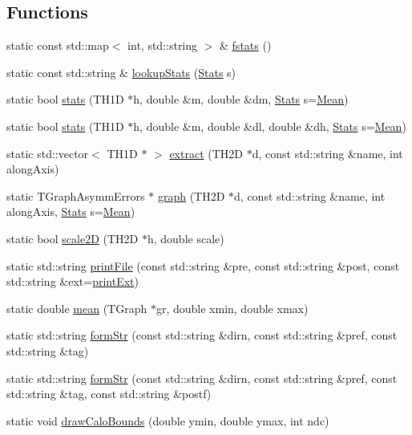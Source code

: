 \subsection*{Functions}
\begin{DoxyCompactItemize}
\item 
static const std\+::map$<$ int, std\+::string $>$ \& \hyperlink{namespaceHistUtils_a763ef83bda6c72effba6b89023f6ed51}{fstats} ()
\item 
static const std\+::string \& \hyperlink{namespaceHistUtils_abdbe4f180f6fd3236fd6f8ceb9166862}{lookup\+Stats} (\hyperlink{namespaceHistUtils_aee957b08165ec79d9ab22d3985938110}{Stats} s)
\item 
static bool \hyperlink{namespaceHistUtils_a75d5e50c598254d5415d2b2e1919eae9}{stats} (T\+H1D $\ast$h, double \&m, double \&dm, \hyperlink{namespaceHistUtils_aee957b08165ec79d9ab22d3985938110}{Stats} s=\hyperlink{namespaceHistUtils_aee957b08165ec79d9ab22d3985938110ae57ec394e887bc7762c6476186d7eaf8}{Mean})
\item 
static bool \hyperlink{namespaceHistUtils_a0ae5e8fb9c5a958bacd0827d3d05a7bf}{stats} (T\+H1D $\ast$h, double \&m, double \&dl, double \&dh, \hyperlink{namespaceHistUtils_aee957b08165ec79d9ab22d3985938110}{Stats} s=\hyperlink{namespaceHistUtils_aee957b08165ec79d9ab22d3985938110ae57ec394e887bc7762c6476186d7eaf8}{Mean})
\item 
static std\+::vector$<$ T\+H1D $\ast$ $>$ \hyperlink{namespaceHistUtils_a383a62e11470b0d24d33f2c464b72f59}{extract} (T\+H2D $\ast$d, const std\+::string \&name, int along\+Axis)
\item 
static T\+Graph\+Asymm\+Errors $\ast$ \hyperlink{namespaceHistUtils_a9abc1fea2a65fb19bf19bb1be852d7fa}{graph} (T\+H2D $\ast$d, const std\+::string \&name, int along\+Axis, \hyperlink{namespaceHistUtils_aee957b08165ec79d9ab22d3985938110}{Stats} s=\hyperlink{namespaceHistUtils_aee957b08165ec79d9ab22d3985938110ae57ec394e887bc7762c6476186d7eaf8}{Mean})
\item 
static bool \hyperlink{namespaceHistUtils_ad08060ea4a76cdf48a806c40b4374954}{scale2D} (T\+H2D $\ast$h, double scale)
\item 
static std\+::string \hyperlink{namespaceHistUtils_a58dcc08a0178093c596c86b8b99b5f8d}{print\+File} (const std\+::string \&pre, const std\+::string \&post, const std\+::string \&ext=\hyperlink{namespaceHistUtils_acb065721325221957da36e6ac87c0062}{print\+Ext})
\item 
static double \hyperlink{namespaceHistUtils_af92ee23ad35cba919099610d716bbb93}{mean} (T\+Graph $\ast$gr, double xmin, double xmax)
\item 
static std\+::string \hyperlink{namespaceHistUtils_a7c2fb7126abd490e2b35d9f0da8e334b}{form\+Str} (const std\+::string \&dirn, const std\+::string \&pref, const std\+::string \&tag)
\item 
static std\+::string \hyperlink{namespaceHistUtils_a278ca8855cbfe4846e64ea99c1071d87}{form\+Str} (const std\+::string \&dirn, const std\+::string \&pref, const std\+::string \&tag, const std\+::string \&postf)
\item 
static void \hyperlink{namespaceHistUtils_a5b9e3c8e95d0626bd82c113eaf0ff84d}{draw\+Calo\+Bounds} (double ymin, double ymax, int ndc)
\end{DoxyCompactItemize}
